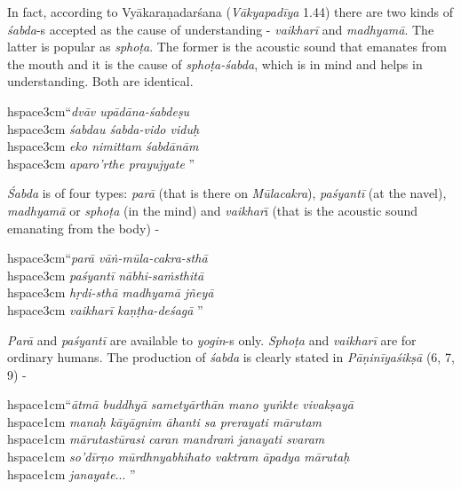 In fact, according to Vyākaraṇadarśana (\textit{Vākyapadīya} 1.44) there are two kinds of \textit{śabda}-s accepted as the cause of understanding - \textit{vaikharī} and \textit{madhyamā}. The latter is popular as \textit{sphoṭa}. The former is the acoustic sound that emanates from the mouth and it is the cause of \textit{sphoṭa-śabda}, which is in mind and helps in understanding. Both are identical.

\begin{myquote}
hspace{3cm}“\textit{dvāv upādāna-śabdeṣu}\\hspace{3cm} \textit{śabdau śabda-vido viduḥ} \\hspace{3cm} \textit{eko nimittam śabdānām}\\hspace{3cm} \textit{aparo’rthe prayujyate} ”
\end{myquote}

\textit{Śabda} is of four types: \textit{parā} (that is there on \textit{Mūlacakra}), \textit{paśyantī} (at the navel), \textit{madhyamā} or \textit{sphoṭa} (in the mind) and \textit{vaikhar}ī (that is the acoustic sound emanating from the body) -

\begin{myquote}
hspace{3cm}“\textit{parā vāṅ-mūla-cakra-sthā}\\hspace{3cm} \textit{paśyantī nābhi-saṁsthitā }\\hspace{3cm} \textit{hṛdi-sthā madhyamā jñeyā}\\hspace{3cm} \textit{vaikharī kaṇṭha-deśagā} ” 
\end{myquote}

\textit{Parā} and \textit{paśyantī} are available to \textit{yogin}-s only. \textit{Sphoṭa} and \textit{vaikharī} are for ordinary humans. The production of \textit{śabda} is clearly stated in \textit{Pāṇinīyaśikṣā} (6, 7, 9) -

\begin{myquote}
hspace{1cm}“\textit{ātmā buddhyā sametyārthān mano yuṅkte vivakṣayā }\\hspace{1cm} \textit{manaḥ kāyāgnim āhanti sa prerayati mārutam }\\hspace{1cm} \textit{mārutastūrasi caran mandraṁ janayati svaram }\\hspace{1cm} \textit{so’dīrṇo mūrdhnyabhihato vaktram āpadya mārutaḥ }\\hspace{1cm} \textit{janayate}... ”
\end{myquote}

